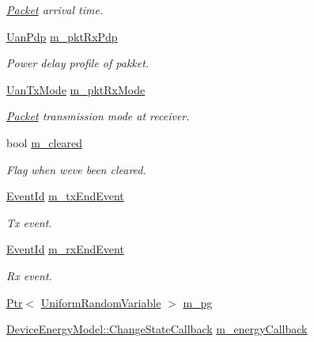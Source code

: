 \begin{DoxyCompactItemize}
\begin{DoxyCompactList}\small\item\em \hyperlink{classns3_1_1Packet}{Packet} arrival time. \end{DoxyCompactList}\item 
\hyperlink{classns3_1_1UanPdp}{Uan\+Pdp} \hyperlink{classns3_1_1UanPhyGen_af24f3aed137da95684f10c963e8fb2ff}{m\+\_\+pkt\+Rx\+Pdp}
\begin{DoxyCompactList}\small\item\em Power delay profile of pakket. \end{DoxyCompactList}\item 
\hyperlink{classns3_1_1UanTxMode}{Uan\+Tx\+Mode} \hyperlink{classns3_1_1UanPhyGen_abce657fc1ddcb1dd7b3023d13498b3ae}{m\+\_\+pkt\+Rx\+Mode}
\begin{DoxyCompactList}\small\item\em \hyperlink{classns3_1_1Packet}{Packet} transmission mode at receiver. \end{DoxyCompactList}\item 
bool \hyperlink{classns3_1_1UanPhyGen_a9de08dc96224def6cf358e260e10ad5a}{m\+\_\+cleared}
\begin{DoxyCompactList}\small\item\em Flag when we\textquotesingle{}ve been cleared. \end{DoxyCompactList}\item 
\hyperlink{classns3_1_1EventId}{Event\+Id} \hyperlink{classns3_1_1UanPhyGen_a98ff1f294850555c8e8d41b23e39306a}{m\+\_\+tx\+End\+Event}
\begin{DoxyCompactList}\small\item\em Tx event. \end{DoxyCompactList}\item 
\hyperlink{classns3_1_1EventId}{Event\+Id} \hyperlink{classns3_1_1UanPhyGen_a6f4432c8a32e88cb4dee34c29b2f9e92}{m\+\_\+rx\+End\+Event}
\begin{DoxyCompactList}\small\item\em Rx event. \end{DoxyCompactList}\item 
\hyperlink{classns3_1_1Ptr}{Ptr}$<$ \hyperlink{classns3_1_1UniformRandomVariable}{Uniform\+Random\+Variable} $>$ \hyperlink{classns3_1_1UanPhyGen_a950a13a6d3bca0316560f3d985af516a}{m\+\_\+pg}
\item 
\hyperlink{classns3_1_1DeviceEnergyModel_a26632ed1b86ee8f6c7fc4c756f0027ad}{Device\+Energy\+Model\+::\+Change\+State\+Callback} \hyperlink{classns3_1_1UanPhyGen_a6ccfca5d21f3915b06d48951a670d573}{m\+\_\+energy\+Callback}

\end{DoxyCompactItemize}
